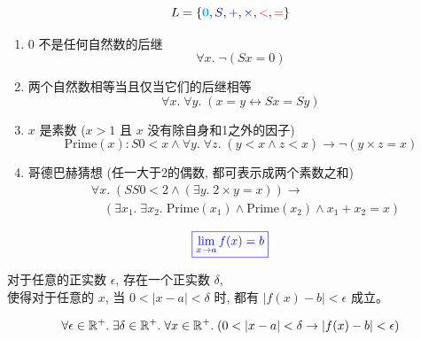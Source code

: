 \begin{frame}{}
  \[
    L = \{\textbf{\textcolor{cyan}{0}}, \textcolor{blue}{S}, \textcolor{blue}{+}, \textcolor{blue}{\times}, \textcolor{red}{<}, \textcolor{red}{=}\}
  \]

  \vspace{0.30cm}
  \begin{enumerate}[(1)]
    \setlength{\itemsep}{8pt}
    \pause
    \item 0 不是任何自然数的后继
      \pause
      \[
        \forall x.\; \lnot (Sx = 0)
      \]
    \pause
    \vspace{-0.50cm}
    \item 两个自然数相等当且仅当它们的后继相等
      \pause
      \[
        \forall x.\; \forall y.\; (x = y \leftrightarrow Sx = Sy)
      \]
    \pause
    \vspace{-0.50cm}
    \item $x$ 是素数 ($x > 1$ 且 $x$ 没有除自身和1之外的因子)
      \pause
      \[
        \text{Prime}(x): S0 < x \land \forall y.\; \forall z.\; (y < x \land z < x) \to \lnot (y \times z = x)
      \]
    \pause
    \vspace{-0.50cm}
    \item 哥德巴赫猜想 (任一大于2的偶数, 都可表示成两个素数之和)
      \pause
      \begin{align*}
        &\forall x.\; (SS0 < 2 \land (\exists y.\; 2 \times y = x)) \to \\
          &\quad (\exists x_{1}.\; \exists x_{2}.\; \text{Prime}(x_{1}) \land \text{Prime}(x_{2})
            \land x_{1} + x_{2} = x)
      \end{align*}
  \end{enumerate}
\end{frame}

\begin{frame}{}
  \[
    \textcolor{blue}{\boxed{\lim_{x \to a} f(x) = b}}
  \]

  \pause
  \vspace{0.30cm}
  \begin{center}
    对于任意的正实数 $\epsilon$, 存在一个正实数 $\delta$, \\[6pt]
    使得对于任意的 $x$, 当 $0 < |x - a| < \delta$ 时, 都有 $|f(x) - b| < \epsilon$ 成立。
  \end{center}

  \pause
  \[
    \forall \epsilon \in \mathbb{R}^{+}.\; \exists \delta \in \mathbb{R}^{+}.\;
      \forall x \in \mathbb{R}^{+}.\; (0 < |x - a| < \delta \to |f(x) - b| < \epsilon)
  \]
\end{frame}

